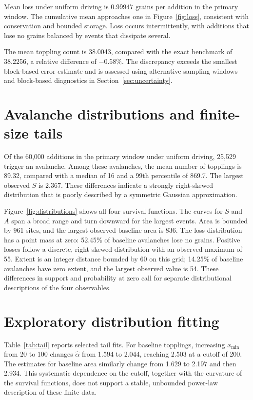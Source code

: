 \documentclass[11pt,a4paper,oneside]{report}
\numberwithin{equation}{chapter}
\begin{document}


Mean loss under uniform driving is 0.99947 grains per addition in the primary window. The cumulative mean approaches one in Figure~\ref{fig:loss}, consistent with conservation and bounded storage. Loss occurs intermittently, with additions that lose no grains balanced by events that dissipate several.

The mean toppling count is 38.0043, compared with the exact benchmark of 38.2256, a relative difference of $-0.58\%$. The discrepancy exceeds the smallest block-based error estimate and is assessed using alternative sampling windows and block-based diagnostics in Section~\ref{sec:uncertainty}.

\FloatBarrier

\section{Avalanche distributions and finite-size tails}
\label{sec:distributions}
Of the 60,000 additions in the primary window under uniform driving, 25,529 trigger an avalanche. Among these avalanches, the mean number of topplings is 89.32, compared with a median of 16 and a 99th percentile of 869.7. The largest observed $S$ is 2,367. These differences indicate a strongly right-skewed distribution that is poorly described by a symmetric Gaussian approximation.

Figure~\ref{fig:distributions} shows all four survival functions. The curves for $S$ and $A$ span a broad range and turn downward for the largest events. Area is bounded by 961 sites, and the largest observed baseline area is 836. The loss distribution has a point mass at zero: 52.45\% of baseline avalanches lose no grains. Positive losses follow a discrete, right-skewed distribution with an observed maximum of 55. Extent is an integer distance bounded by 60 on this grid; 14.25\% of baseline avalanches have zero extent, and the largest observed value is 54. These differences in support and probability at zero call for separate distributional descriptions of the four observables.



\clearpage
\section{Exploratory distribution fitting}
\label{sec:tailresults}
Table~\ref{tab:tail} reports selected tail fits. For baseline topplings, increasing $x_{\min}$ from 20 to 100 changes $\hat\alpha$ from 1.594 to 2.044, reaching 2.503 at a cutoff of 200. The estimates for baseline area similarly change from 1.629 to 2.197 and then 2.934. This systematic dependence on the cutoff, together with the curvature of the survival functions, does not support a stable, unbounded power-law description of these finite data.
\end{document}
